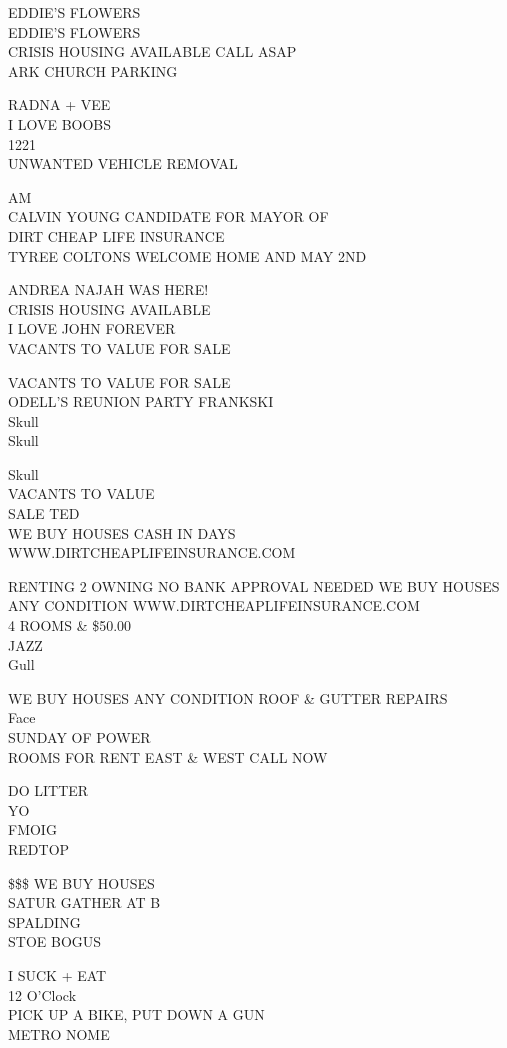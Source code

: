 \documentclass[10pt,letterpaper]{article}
\begin{document}
EDDIE'S FLOWERS\\
EDDIE'S FLOWERS\\
CRISIS HOUSING AVAILABLE CALL ASAP\\
ARK CHURCH PARKING

RADNA + VEE\\
I LOVE BOOBS\\
1221\\
UNWANTED VEHICLE REMOVAL

AM\\
CALVIN YOUNG CANDIDATE FOR MAYOR OF\\
DIRT CHEAP LIFE INSURANCE\\
TYREE COLTONS WELCOME HOME AND MAY 2ND

ANDREA NAJAH WAS HERE!\\
CRISIS HOUSING AVAILABLE\\
I LOVE JOHN FOREVER\\
VACANTS TO VALUE FOR SALE

VACANTS TO VALUE FOR SALE\\
ODELL'S REUNION PARTY FRANKSKI\\
Skull\\
Skull

Skull\\
VACANTS TO VALUE\\
SALE TED\\
WE BUY HOUSES CASH IN DAYS WWW.DIRTCHEAPLIFEINSURANCE.COM

RENTING 2 OWNING NO BANK APPROVAL NEEDED WE BUY HOUSES ANY CONDITION WWW.DIRTCHEAPLIFEINSURANCE.COM\\
4 ROOMS \& \$50.00\\
JAZZ\\
Gull

WE BUY HOUSES ANY CONDITION ROOF \& GUTTER REPAIRS\\
Face\\
SUNDAY OF POWER\\
ROOMS FOR RENT EAST \& WEST CALL NOW

DO LITTER\\
YO\\
FMOIG\\
REDTOP

\$\$\$ WE BUY HOUSES\\
SATUR GATHER AT B\\
SPALDING\\
STOE BOGUS

I SUCK + EAT\\
12 O'Clock\\
PICK UP A BIKE, PUT DOWN A GUN\\
METRO NOME
\end{document}
